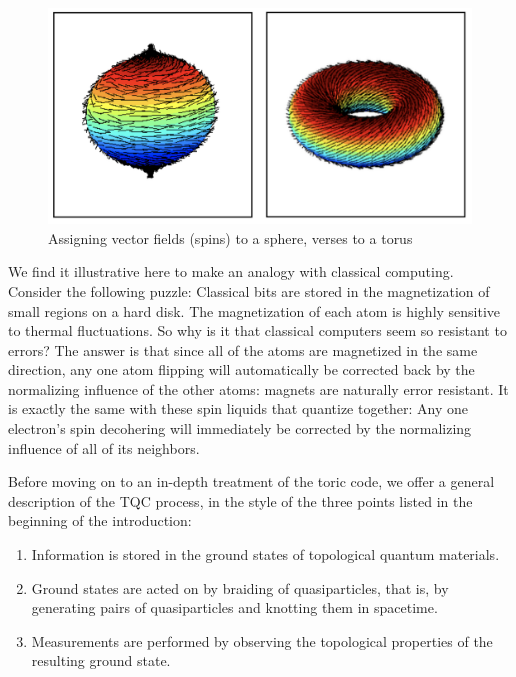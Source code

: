 \documentclass{article}
\theoremstyle{definition}
\numberwithin{figure}{section}
\begin{document}
\begin{figure}
\begin{center}
\includegraphics[scale=0.2]{Hairy-Ball-Diagram}
\caption{Assigning vector fields (spins) to a sphere, verses to a torus}
\label{fig:hairy-ball}
\end{center}
\end{figure}

We find it illustrative here to make an analogy with classical computing. Consider the following puzzle: Classical bits are stored in the magnetization of small regions on a hard disk. The magnetization of each atom is highly sensitive to thermal fluctuations. So why is it that classical computers seem so resistant to errors? The answer is that since all of the atoms are magnetized in the same direction, any one atom flipping will automatically be corrected back by the normalizing influence of the other atoms: magnets are naturally error resistant. It is exactly the same with these spin liquids that quantize together: Any one electron's spin decohering will immediately be corrected by the normalizing influence of all of its neighbors.

Before moving on to an in-depth treatment of the toric code, we offer a general description of the TQC process, in the style of the three points listed in the beginning of the introduction:

\begin{enumerate}
\item Information is stored in the ground states of topological quantum materials.
\item Ground states are acted on by braiding of quasiparticles, that is, by generating pairs of quasiparticles and knotting them in spacetime.
\item Measurements are performed by observing the topological properties of the resulting ground state.
\end{enumerate}
\end{document}
